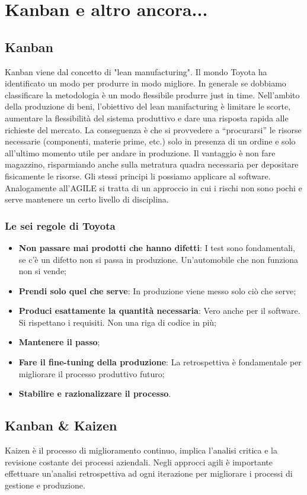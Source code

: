 \section{Kanban e altro ancora...}
\subsection{Kanban}
Kanban viene dal concetto di "lean manufacturing". Il mondo Toyota ha identificato un modo per produrre in modo migliore. In generale se dobbiamo classificare la metodologia è un modo flessibile produrre just in time. Nell’ambito della produzione di beni, l’obiettivo del lean manifacturing è limitare le scorte, aumentare la flessibilità del sistema produttivo e dare una risposta rapida alle richieste del mercato. La conseguenza è che si provvedere a “procurarsi” le risorse necessarie (componenti, materie prime, etc.) solo in presenza di un ordine e solo all’ultimo momento utile per andare in produzione.
Il vantaggio è non fare magazzino, risparmiando anche sulla metratura quadra necessaria per depositare fisicamente le risorse. Gli stessi principi li possiamo applicare al software.
Analogamente all'AGILE si tratta di un approccio in cui i rischi non sono pochi e serve mantenere un certo livello di disciplina.

\subsubsection{Le sei regole di Toyota}
\begin{itemize}
	\item \textbf{Non passare mai prodotti che hanno difetti}: I test sono fondamentali, se c'è un difetto non si passa in produzione. Un'automobile che non funziona non si vende;
	\item \textbf{Prendi solo quel che serve}: In produzione viene messo solo ciò che serve;
	\item \textbf{Produci esattamente la quantità necessaria}: Vero anche per il software. Si rispettano i requisiti. Non una riga di codice in più;
	\item \textbf{Mantenere il passo};
	\item \textbf{Fare il fine-tuning della produzione}: La retrospettiva è fondamentale per migliorare il processo produttivo futuro;
	\item \textbf{Stabilire e razionalizzare il processo}.
\end{itemize}
\subsection{Kanban \& Kaizen}
Kaizen è il processo di miglioramento continuo, implica l’analisi critica e la revisione
costante dei processi aziendali. Negli approcci agili è importante effettuare un’analisi retrospettiva ad ogni iterazione per migliorare i processi di gestione e produzione.
